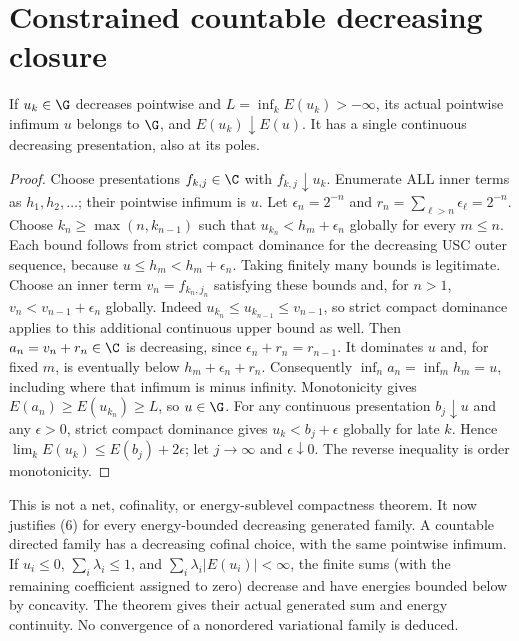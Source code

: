 \section{Constrained countable decreasing closure}
\begin{theorem}
If $u_k\in\G$ decreases pointwise and $L=\inf_kE(u_k)>-\infty$, its actual
pointwise infimum $u$ belongs to $\G$, and $E(u_k)\downarrow E(u)$.
It has a single continuous decreasing presentation, also at its poles.
\end{theorem}
\begin{proof}
Choose presentations $f_{k,j}\in\C$ with $f_{k,j}\downarrow u_k$.
Enumerate ALL inner terms as $h_1,h_2,\ldots$; their pointwise infimum is $u$.
Let $\epsilon_n=2^{-n}$ and $r_n=\sum_{\ell>n}\epsilon_\ell=2^{-n}$.
Choose $k_n\ge\max(n,k_{n-1})$ such that
$u_{k_n}<h_m+\epsilon_n$ globally for every $m\le n$.
Each bound follows from strict compact dominance for the decreasing USC outer
sequence, because $u\le h_m<h_m+\epsilon_n$. Taking finitely many bounds
is legitimate. Choose an inner term $v_n=f_{k_n,j_n}$ satisfying these bounds
and, for $n>1$, $v_n<v_{n-1}+\epsilon_n$ globally. Indeed
$u_{k_n}\le u_{k_{n-1}}\le v_{n-1}$, so strict compact dominance applies
to this additional continuous upper bound as well.
Then $a_n=v_n+r_n\in\C$ is decreasing, since
$\epsilon_n+r_n=r_{n-1}$. It dominates $u$ and, for fixed $m$, is eventually
below $h_m+\epsilon_n+r_n$. Consequently $\inf_na_n=\inf_mh_m=u$,
including where that infimum is minus infinity. Monotonicity gives
$E(a_n)\ge E(u_{k_n})\ge L$, so $u\in\G$.
For any continuous presentation $b_j\downarrow u$ and any $\epsilon>0$,
strict compact dominance gives $u_k<b_j+\epsilon$ globally for late $k$.
Hence $\lim_kE(u_k)\le E(b_j)+2\epsilon$; let $j\to\infty$ and
$\epsilon\downarrow0$. The reverse inequality is order monotonicity.
\end{proof}
This is not a net, cofinality, or energy-sublevel compactness theorem.
It now justifies (6) for every energy-bounded decreasing generated family.
A countable directed family has a decreasing cofinal choice, with the same
pointwise infimum. If $u_i\le0$, $\sum_i\lambda_i\le1$, and
$\sum_i\lambda_i|E(u_i)|<\infty$, the finite sums (with the remaining
coefficient assigned to zero) decrease and have energies bounded below by
concavity. The theorem gives their actual generated sum and energy continuity.
No convergence of a nonordered variational family is deduced.
